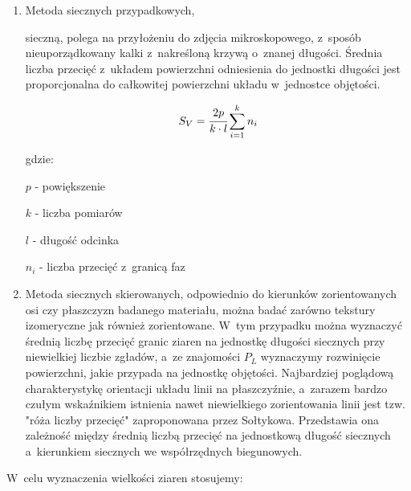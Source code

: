 \documentclass[a4paper,12pt]{article}
\begin{document}
\begin{enumerate}
    \item  Metoda siecznych przypadkowych, {\color{blue} sieczną, polega na przyłożeniu do zdjęcia mikroskopowego, z~sposób nieuporządkowany kalki z~nakreśloną krzywą o~znanej długości. Średnia liczba przecięć z~układem powierzchni odniesienia do jednostki długości jest proporcjonalna do całkowitej powierzchni układu w~jednostce objętości. 
    
$$S_V=\cfrac{2p}{k\cdot l} \sum ^k_{i=1}n_i$$

gdzie:

$p$ - powiększenie

$k$ - liczba pomiarów

$l$ - długość odcinka

$n_i$ - liczba przecięć z~granicą faz
    } 
    \item  Metoda siecznych skierowanych, odpowiednio do kierunków zorientowanych osi czy płaszczyzn badanego materiału, można badać zarówno tekstury izomeryczne jak również zorientowane. W~tym przypadku można wyznaczyć średnią liczbę przecięć granic ziaren na jednostkę długości siecznych przy niewielkiej liczbie zgładów, a~ze znajomości $P_L$ wyznaczymy rozwinięcie powierzchni, jakie przypada na jednostkę objętości. Najbardziej poglądową charakterystykę orientacji układu linii na płaszczyźnie, a~zarazem bardzo czułym wskaźnikiem istnienia nawet niewielkiego zorientowania linii jest tzw. "róża liczby przecięć" zaproponowana przez Sołtykowa. Przedstawia ona zależność między średnią liczbą przecięć na jednostkową długość siecznych a~kierunkiem siecznych we współrzędnych biegunowych.
\end{enumerate}

W~celu wyznaczenia wielkości ziaren  stosujemy:
\end{document}
